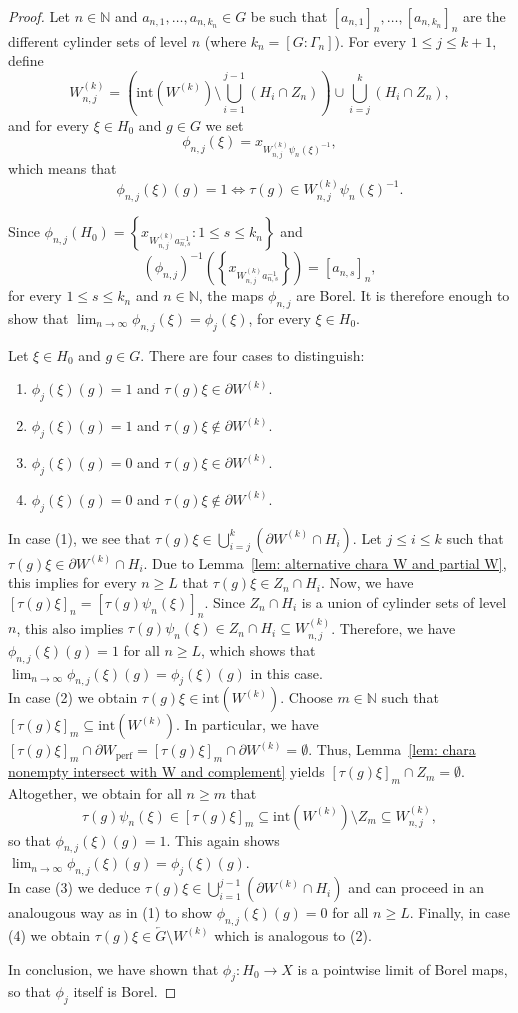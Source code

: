 \documentclass[10pt,a4paper]{amsart}
\def\N{{\mathbb N}}
\newcommand{\kl}{\left(}
\newcommand{\kr}{\right)}
\newcommand{\tm}{\subseteq}
\begin{document}
\begin{proof}
Let $n\in\N$ and $a_{n,1},\ldots, a_{n,k_n}\in G$ be such that $[a_{n,1}]_n,\ldots, [a_{n,k_n}]_{n}$  are  the different cylinder sets of level $n$ (where $k_n=[G:\Gamma_n]$). For every $1\leq j\leq k+1$, define 
$$W_{n,j}^{(k)}=\kl\mathrm{int}(W^{(k)})\setminus\bigcup_{i=1}^{j-1} (H_i \cap Z_n)\kr\cup \bigcup_{i=j}^k\left(H_i\cap Z_n\right),$$
and for every $\xi\in H_0$ and $g\in G$ we set $$\phi_{n,j}(\xi) = x_{W_{n,j}^{(k)}\psi_n(\xi)^{-1}},$$ which means that 
$$\phi_{n,j}(\xi)(g) = 1 \iff \tau(g) \in W_{n,j}^{(k)}\psi_n(\xi)^{-1}.$$

Since  $\phi_{n,j}(H_0)=\left\{x_{W_{n,j}^{(k)}a_{n,s}^{-1}}: 1\leq s\leq k_n\right\}$ and
$$(\phi_{n,j})^{-1}\left(\left\{x_{W_{n,j}^{(k)}a_{n,s}^{-1}}\right\}\right)=[a_{n,s}]_n,$$ for every $1\leq s\leq k_n$ and $n\in \N$, the maps $\phi_{n,j}$ are Borel.
It is therefore enough to show that $\lim_{n\to \infty}\phi_{n,j}(\xi)=\phi_j(\xi)$, for every $\xi\in H_0$. 

Let $\xi\in H_0$ and $g\in G$.
There are four cases to distinguish:
\begin{enumerate}
    \item $\phi_j(\xi)(g)=1$ and $\tau(g)\xi \in \partial W^{(k)}$.
    \item $\phi_j(\xi)(g)= 1 $ and $\tau(g) \xi\notin \partial W^{(k)}$.
    \item $\phi_j(\xi)(g)=0$ and $\tau(g)\xi \in \partial W^{(k)}$. 
    \item $\phi_j(\xi)(g)=0$ and $\tau(g)\xi\notin \partial W^{(k)}$.
\end{enumerate}
In case (1), we see that $\tau(g)\xi \in \bigcup_{i=j}^k(\partial W^{(k)} \cap H_i)$.
Let $j\leq i \leq k$ such that $\tau(g)\xi \in \partial W^{(k)}\cap H_i$.
Due to Lemma~\ref{lem: alternative chara W and partial W}, this implies for every $n\geq L$ that $\tau(g)\xi\in Z_n \cap H_i$.
Now, we have $[\tau(g)\xi]_n = [\tau(g)\psi_n(\xi)]_n$.
Since $Z_n\cap H_i$ is a union of cylinder sets of level $n$, this also implies $\tau(g) \psi_n(\xi) \in Z_n\cap H_i \tm W_{n,j}^{(k)}$.
Therefore, we have $\phi_{n,j}(\xi)(g) = 1$ for all $n\geq L$, which shows that $\lim_{n\to \infty}\phi_{n,j}(\xi)(g)=\phi_j(\xi)(g)$ in this case.\\
In case (2) we obtain $\tau(g)\xi \in \mathrm{int}(W^{(k)})$.
Choose $m\in \N$ such that $[\tau(g)\xi]_m\tm \mathrm{int}(W^{(k)})$.
In particular, we have $[\tau(g)\xi]_m\cap \partial W_{\mathrm{perf}} = [\tau(g)\xi]_m \cap \partial W^{(k)} = \emptyset$.
Thus, Lemma~\ref{lem: chara nonempty intersect with W and complement} yields $[\tau(g)\xi]_m\cap Z_m=\emptyset$.
Altogether, we obtain for all $n\geq m$ that 
$$ \tau(g)\psi_n(\xi) \in [\tau(g)\xi]_m \tm \mathrm{int}(W^{(k)}) \setminus Z_m \tm W_{n,j}^{(k)},$$
so that $\phi_{n,j}(\xi)(g) = 1$. This again shows $\lim_{n\to \infty}\phi_{n,j}(\xi)(g)=\phi_j(\xi)(g)$.\\
In case (3) we deduce $\tau(g)\xi\in \bigcup_{i=1}^{j-1}(\partial W^{(k)}\cap H_i)$ and can proceed in an analougous way as in (1) to show $\phi_{n,j}(\xi)(g) = 0$ for all $n\geq L$. Finally, in case (4) we obtain $\tau(g)\xi \in \overleftarrow{G}\setminus W^{(k)}$ which is analogous to (2).

In conclusion, we have shown that $\phi_j:H_0\to X$ is a pointwise limit of Borel maps, so that $\phi_j$ itself is Borel.
\end{proof}
\end{document}
